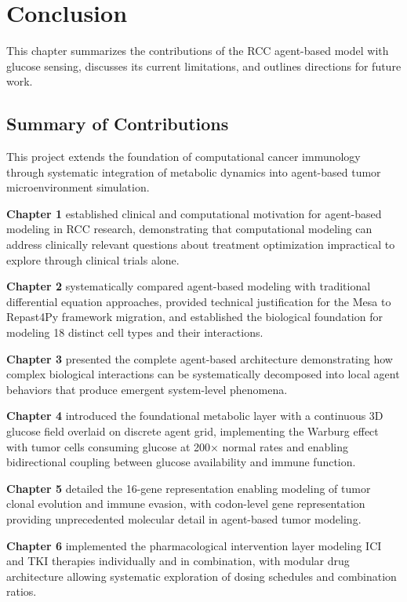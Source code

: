 \chapter{Conclusion}
\label{ch:conclusion}

This chapter summarizes the contributions of the RCC agent-based model with glucose sensing, discusses its current limitations, and outlines directions for future work.

\section{Summary of Contributions}
\label{sec:contributions}

This project extends the foundation of computational cancer immunology through systematic integration of metabolic dynamics into agent-based tumor microenvironment simulation.

\textbf{Chapter 1} established clinical and computational motivation for agent-based modeling in RCC research, demonstrating that computational modeling can address clinically relevant questions about treatment optimization impractical to explore through clinical trials alone.

\textbf{Chapter 2} systematically compared agent-based modeling with traditional differential equation approaches, provided technical justification for the Mesa to Repast4Py framework migration, and established the biological foundation for modeling 18 distinct cell types and their interactions.

\textbf{Chapter 3} presented the complete agent-based architecture demonstrating how complex biological interactions can be systematically decomposed into local agent behaviors that produce emergent system-level phenomena.

\textbf{Chapter 4} introduced the foundational metabolic layer with a continuous 3D glucose field overlaid on discrete agent grid, implementing the Warburg effect with tumor cells consuming glucose at 200× normal rates and enabling bidirectional coupling between glucose availability and immune function.

\textbf{Chapter 5} detailed the 16-gene representation enabling modeling of tumor clonal evolution and immune evasion, with codon-level gene representation providing unprecedented molecular detail in agent-based tumor modeling.

\textbf{Chapter 6} implemented the pharmacological intervention layer modeling ICI and TKI therapies individually and in combination, with modular drug architecture allowing systematic exploration of dosing schedules and combination ratios.

